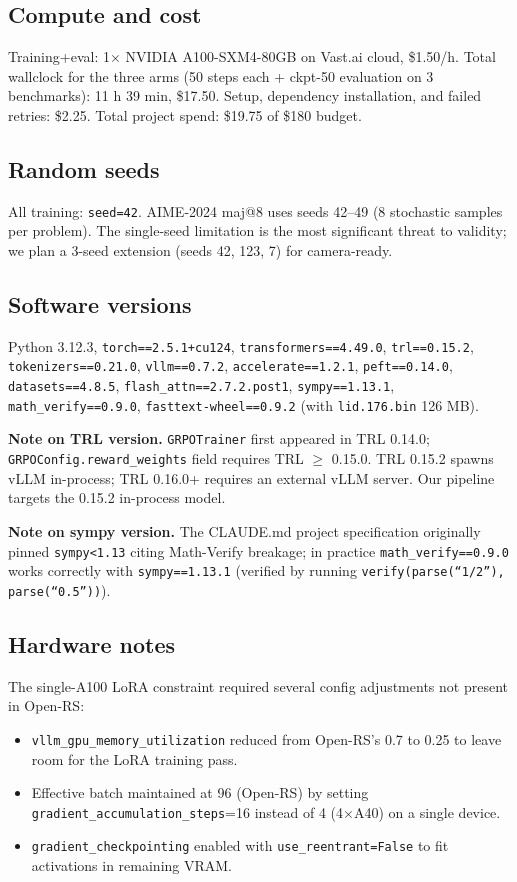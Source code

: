 \subsection{Compute and cost}
Training+eval: 1$\times$ NVIDIA A100-SXM4-80GB on Vast.ai cloud, \$1.50/h.
Total wallclock for the three arms (50 steps each + ckpt-50 evaluation on
3 benchmarks): 11 h 39 min, \$17.50.
Setup, dependency installation, and failed retries: \$2.25.
Total project spend: \$19.75 of \$180 budget.

\subsection{Random seeds}
All training: \texttt{seed=42}. AIME-2024 maj@8 uses seeds 42--49 (8 stochastic
samples per problem). The single-seed limitation is the most significant
threat to validity; we plan a 3-seed extension (seeds 42, 123, 7) for camera-ready.

\subsection{Software versions}
Python 3.12.3, \texttt{torch==2.5.1+cu124}, \texttt{transformers==4.49.0},
\texttt{trl==0.15.2}, \texttt{tokenizers==0.21.0}, \texttt{vllm==0.7.2},
\texttt{accelerate==1.2.1}, \texttt{peft==0.14.0}, \texttt{datasets==4.8.5},
\texttt{flash\_attn==2.7.2.post1}, \texttt{sympy==1.13.1},
\texttt{math\_verify==0.9.0}, \texttt{fasttext-wheel==0.9.2}
(with \texttt{lid.176.bin} 126 MB).

\textbf{Note on TRL version.} \texttt{GRPOTrainer} first appeared in TRL 0.14.0;
\texttt{GRPOConfig.reward\_weights} field requires TRL $\geq$ 0.15.0. TRL 0.15.2
spawns vLLM in-process; TRL 0.16.0+ requires an external vLLM server. Our pipeline
targets the 0.15.2 in-process model.

\textbf{Note on sympy version.} The CLAUDE.md project specification originally
pinned \texttt{sympy<1.13} citing Math-Verify breakage; in practice
\texttt{math\_verify==0.9.0} works correctly with \texttt{sympy==1.13.1}
(verified by running \texttt{verify(parse(``1/2''), parse(``0.5''))}).

\subsection{Hardware notes}
The single-A100 LoRA constraint required several config adjustments not present
in Open-RS:
\begin{itemize}\itemsep0pt
\item \texttt{vllm\_gpu\_memory\_utilization} reduced from Open-RS's 0.7 to 0.25 to
leave room for the LoRA training pass.
\item Effective batch maintained at 96 (Open-RS) by setting
\texttt{gradient\_accumulation\_steps}=16 instead of 4 (4$\times$A40) on a single
device.
\item \texttt{gradient\_checkpointing} enabled with
\texttt{use\_reentrant=False} to fit activations in remaining VRAM.
\end{itemize}

